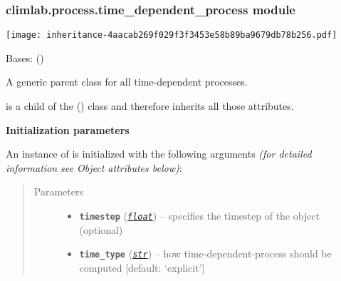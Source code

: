 \documentclass[a4paper,10pt,english]{sphinxmanual}
\begin{document}
\subsubsection{climlab.process.time\_dependent\_process module}
\label{api/climlab.process:climlab-process-time-dependent-process-module}
\texttt{[image: inheritance-4aacab269f029f3f3453e58b89ba9679db78b256.pdf]}
\label{api/climlab.process:module-climlab.process.time_dependent_process}

\begin{fulllineitems}
\label{api/climlab.process:climlab.process.time_dependent_process.TimeDependentProcess}
Bases: {\hyperref[api/climlab.process:climlab.process.process.Process]{\emph{}}} ()

A generic parent class for all time-dependent processes.

 is a child of the 
{\hyperref[api/climlab.process:climlab.process.process.Process]{\emph{}}} () class and therefore inherits
all those attributes.

\textbf{Initialization parameters}

An instance of  is initialized with the following 
arguments \emph{(for detailed information see Object attributes below)}:
\begin{quote}\begin{description}
\item[{Parameters}] \leavevmode\begin{itemize}
\item {} 
\textbf{\texttt{timestep}} (\href{http://docs.python.org/2.7/library/functions.html\#float}{\emph{\texttt{float}}}) -- specifies the timestep of the object (optional)

\item {} 
\textbf{\texttt{time\_type}} (\href{http://docs.python.org/2.7/library/functions.html\#str}{\emph{\texttt{str}}}) -- how time-dependent-process should be computed 
{[}default: `explicit'{]}


\end{itemize}
\end{description}
\end{quote}
\end{fulllineitems}
\end{document}
